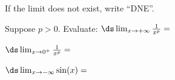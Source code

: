If the limit does not exist, write ``DNE''.

\medskip \noindent Suppose $p>0$.  Evaluate: $\ds \lim_{x\to +\infty} \frac{1}{x^p} = $

\vspace{20mm}

\medskip \noindent $\ds \lim_{x\to 0^+} \frac{1}{x^p} = $

\vspace{25mm}

\medskip \noindent $\ds \lim_{x\to -\infty} \sin(x) = $

